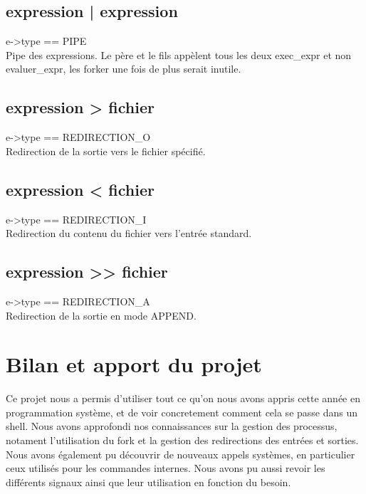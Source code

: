 \documentclass[12pt]{article}
\begin{document}
\subsection{expression | expression}
e->type == PIPE\\
Pipe des expressions. Le père et le fils appèlent tous les deux exec\_expr et non evaluer\_expr,
les forker une fois de plus serait inutile.

\subsection{expression > fichier}
e->type == REDIRECTION\_O\\
Redirection de la sortie vers le fichier spécifié.

\subsection{expression < fichier}
e->type == REDIRECTION\_I\\
Redirection du contenu du fichier vers l'entrée standard.
   

\subsection{expression >> fichier}
e->type == REDIRECTION\_A\\
Redirection de la sortie en mode APPEND.   


\newpage
\section{Bilan et apport du projet}
Ce projet nous a permis d'utiliser tout ce qu'on nous avons appris cette année en programmation système, et de voir concretement comment cela se passe dans un shell.
Nous avons approfondi nos connaissances sur la gestion des processus, notament l'utilisation du fork et la gestion des redirections des entrées et sorties. Nous avons également pu découvrir de nouveaux appels systèmes, en particulier ceux utilisés pour les commandes internes.
Nous avons pu aussi revoir les différents signaux ainsi que leur utilisation en fonction du besoin.
\end{document}
